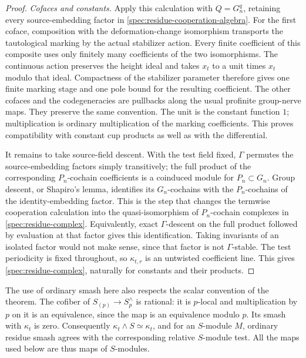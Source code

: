 \begin{proof}
\emph{Cofaces and constants.}
Apply this calculation with \(Q=G_n^q\), retaining every
source-embedding factor in
\eqref{spec:residue-cooperation-algebra}. For the first coface,
composition with the deformation-change isomorphism transports the
tautological marking by the actual stabilizer action. Every finite
coefficient of this composite uses only finitely many coefficients
of the two isomorphisms. The continuous action preserves the height
ideal and takes \(x_t\) to a unit times \(x_t\) modulo that ideal.
Compactness of the stabilizer parameter therefore gives one finite
marking stage and one pole bound for the resulting coefficient.
The other cofaces and the codegeneracies are pullbacks along the
usual profinite group-nerve maps. They preserve the same convention.
The unit is the constant function \(1\); multiplication is ordinary
multiplication of the marking coefficients. This proves compatibility
with constant cup products as well as with the differential.

It remains to take source-field descent. With the
test field fixed, \(\Gamma\) permutes the source-embedding factors
simply transitively; the full product of the corresponding
\(P_n\)-cochain coefficients is a coinduced module for
\(P_n\subset G_n\). Group descent, or Shapiro's lemma, identifies
its \(G_n\)-cochains with the \(P_n\)-cochains of the
identity-embedding factor. This is the step that changes the
termwise cooperation calculation into the quasi-isomorphism of
\(P_n\)-cochain complexes in \eqref{spec:residue-complex}.
Equivalently, exact \(\Gamma\)-descent
on the full product followed by evaluation at that factor gives this
identification. Taking invariants of an isolated factor would not
make sense, since that factor is not \(\Gamma\)-stable. The test
periodicity is fixed throughout, so \(\kappa_{t,r}\) is an
untwisted coefficient line. This gives
\eqref{spec:residue-complex}, naturally for constants and their
products.
\end{proof}

The use of ordinary smash here also respects the scalar convention of
the theorem. The cofiber of \(S_{(p)}\to S_p^\wedge\) is rational:
it is \(p\)-local and multiplication by \(p\) on it is an
equivalence, since the map is an equivalence modulo \(p\).
Its smash with \(\kappa_t\) is zero. Consequently
\(\kappa_t\wedge S\simeq\kappa_t\), and for an \(S\)-module
\(M\), ordinary residue smash agrees with the corresponding
relative \(S\)-module test. All the maps used below are thus maps
of \(S\)-modules.

